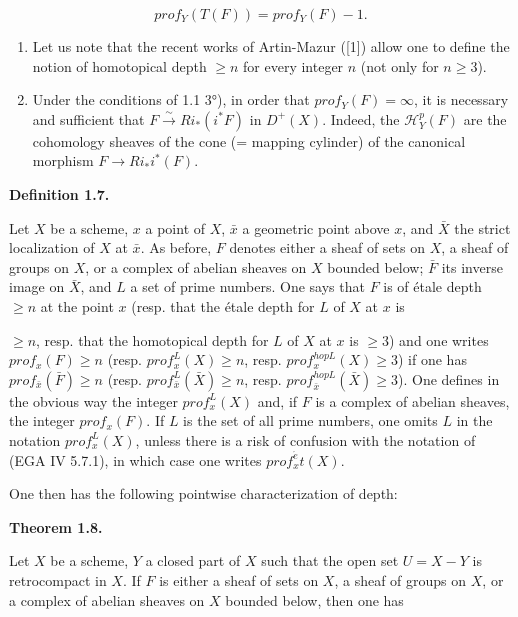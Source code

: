 \documentclass[
]{article}
\begin{document}
\[
prof_{Y}(T(F)) = prof_{Y}(F) - 1.
\]

\begin{enumerate}
\def\labelenumi{\alph{enumi})}
\setcounter{enumi}{5}
\item
  Let us note that the recent works of Artin-Mazur ({[}1{]}) allow one
  to define the notion of homotopical depth \(\geqslant n\) for every
  integer \(n\) (not only for \(n \geqslant 3\)).
\item
  Under the conditions of 1.1 3°), in order that
  \(prof_{Y}(F) = \infty\), it is necessary and sufficient that
  \(F \xrightarrow{\sim} Ri_{*}(i^{*} F)\) in \(D^{+}(X)\). Indeed, the
  \(\mathcal{H}^{p}_{Y}(F)\) are the cohomology sheaves of the cone (=
  mapping cylinder) of the canonical morphism \(F \to Ri_{*} i^{*}(F)\).
\end{enumerate}

\textbf{Definition 1.7.}

Let \(X\) be a scheme, \(x\) a point of \(X\), \(\bar{x}\) a geometric
point above \(x\), and \(\bar{X}\) the strict localization of \(X\) at
\(\bar{x}\). As before, \(F\) denotes either a sheaf of sets on \(X\), a
sheaf of groups on \(X\), or a complex of abelian sheaves on \(X\)
bounded below; \(\bar{F}\) its inverse image on \(\bar{X}\), and \(L\) a
set of prime numbers. One says that \(F\) is of étale depth
\(\geqslant n\) at the point \(x\) (resp. that the étale depth for \(L\)
of \(X\) at \(x\) is

\(\geqslant n\), resp. that the homotopical depth for \(L\) of \(X\) at
\(x\) is \(\geqslant 3\)) and one writes \(prof_{x}(F) \geqslant n\)
(resp. \(prof^{L}_{x}(X) \geqslant n\), resp.
\(prof^{hopL}_{x}(X) \geqslant 3\)) if one has
\(prof_{\bar{x}}(\bar{F}) \geqslant n\) (resp.
\(prof^{L}_{\bar{x}}(\bar{X}) \geqslant n\), resp.
\(prof^{hopL}_{\bar{x}}(\bar{X}) \geqslant 3\)). One defines in the
obvious way the integer \(prof^{L}_{x}(X)\) and, if \(F\) is a complex
of abelian sheaves, the integer \(prof_{x}(F)\). If \(L\) is the set of
all prime numbers, one omits \(L\) in the notation \(prof^{L}_{x}(X)\),
unless there is a risk of confusion with the notation of (EGA IV 5.7.1),
in which case one writes \(prof^{\acute{e}}_{x}t(X)\).

One then has the following pointwise characterization of depth:

\textbf{Theorem 1.8.}

Let \(X\) be a scheme, \(Y\) a closed part of \(X\) such that the open
set \(U = X - Y\) is retrocompact in \(X\). If \(F\) is either a sheaf
of sets on \(X\), a sheaf of groups on \(X\), or a complex of abelian
sheaves on \(X\) bounded below, then one has
\end{document}
